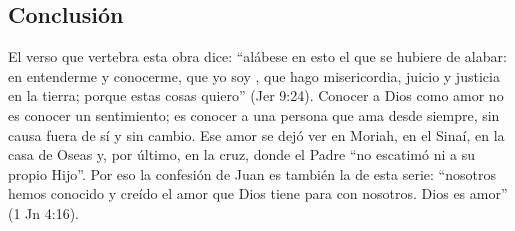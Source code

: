 \subsection{Conclusión}
El verso que vertebra esta obra dice: ``alábese en esto el que se hubiere de alabar: en entenderme y conocerme, que yo soy \SENOR, que hago misericordia, juicio y justicia en la tierra; porque estas cosas quiero'' (Jer 9:24). Conocer a Dios como amor no es conocer un sentimiento; es conocer a una persona que ama desde siempre, sin causa fuera de sí y sin cambio. Ese amor se dejó ver en Moriah, en el Sinaí, en la casa de Oseas y, por último, en la cruz, donde el Padre ``no escatimó ni a su propio Hijo''. Por eso la confesión de Juan es también la de esta serie: ``nosotros hemos conocido y creído el amor que Dios tiene para con nosotros. Dios es amor'' (1 Jn 4:16).

